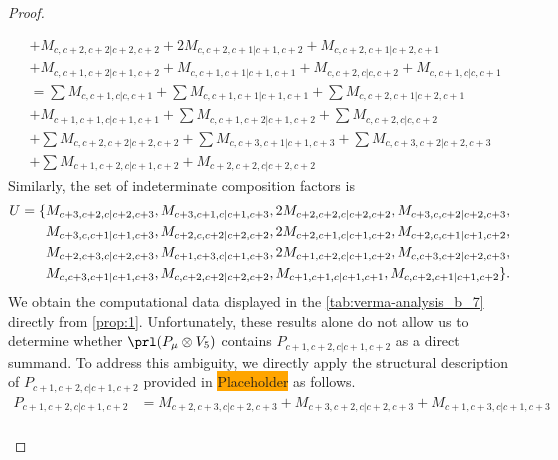 \begin{proof}
\begin{enumerate}
\begin{enumerate}
\begin{equation}
\begin{aligned}
                                              &
+ M_{c,c+2,c+2|c+2,c+2}
+ 2M_{c,c+2,c+1|c+1,c+2}
+ M_{c,c+2,c+1|c+2,c+1}\\
                                              &
+ M_{c,c+1,c+2|c+1,c+2}
+ M_{c,c+1,c+1|c+1,c+1}
+ M_{c,c+2,c|c,c+2}
+ M_{c,c+1,c|c,c+1} \\
                                               &=
\sum M_{c,c+1,c|c,c+1}
+ \sum M_{c,c+1,c+1|c+1,c+1}
+ \sum M_{c,c+2,c+1|c+2,c+1}\\
                                              &
+  M_{c+1,c+1,c|c+1,c+1}
+ \sum M_{c,c+1,c+2|c+1,c+2}
+ \sum M_{c,c+2,c|c,c+2}\\
                                              &
+ \sum M_{c,c+2,c+2|c+2,c+2}
+ \sum M_{c,c+3,c+1|c+1,c+3}
+ \sum M_{c,c+3,c+2|c+2,c+3}\\
                                              &
+ \sum M_{c+1,c+2,c|c+1,c+2}
+  M_{c+2,c+2,c|c+2,c+2}
          \end{aligned}
        \end{equation}
      Similarly, the set of indeterminate composition factors is 
\begin{equation}\notag
  \begin{aligned}
    U = \{
M_{c+3,c+2,c|c+2,c+3},
M_{c+3,c+1,c|c+1,c+3},
2M_{c+2,c+2,c|c+2,c+2},
M_{c+3,c,c+2|c+2,c+3},\\
M_{c+3,c,c+1|c+1,c+3},
M_{c+2,c,c+2|c+2,c+2},
2M_{c+2,c+1,c|c+1,c+2},
M_{c+2,c,c+1|c+1,c+2},\\
M_{c+2,c+3,c|c+2,c+3},
M_{c+1,c+3,c|c+1,c+3},
2M_{c+1,c+2,c|c+1,c+2},
M_{c,c+3,c+2|c+2,c+3},\\
M_{c,c+3,c+1|c+1,c+3},
M_{c,c+2,c+2|c+2,c+2},
M_{c+1,c+1,c|c+1,c+1},
M_{c,c+2,c+1|c+1,c+2}
\}. 
  \end{aligned}
\end{equation}
     We obtain the computational data displayed in the \cref{tab:verma-analysis_b_7} directly from \cref{prop:1}. Unfortunately, these results alone do not allow us to determine whether $\prl(P_\mu \otimes V_5)$ contains $P_{c+1,c+2,c|c+1,c+2}$ as a direct summand. To address this ambiguity, we directly apply the structural description of $P_{c+1,c+2,c|c+1,c+2}$ provided in \colorbox{orange}{Placeholder} as follows.
\begin{equation}\label{eq:1}
  \begin{aligned}
    P_{c+1,c+2,c|c+1,c+2} &=M_{c+2,c+3,c|c+2,c+3}
+M_{c+3,c+2,c|c+2,c+3}
+M_{c+1,c+3,c|c+1,c+3}\\
                                              &

\end{aligned}
\end{equation}
\end{enumerate}
\end{enumerate}
\end{proof}
